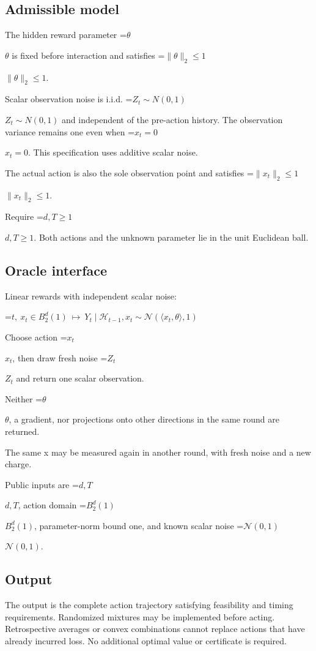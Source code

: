 \documentclass[10pt,a4paper]{article}
\newcommand{\AtlasMath}[1]{\par\begingroup\centering\setbox0=\hbox{$\displaystyle #1$}\ifdim\wd0>1.4\linewidth\typeout{ATLAS WIDE FORMULA: \the\wd0}\fi\ifdim\wd0>\linewidth\resizebox{\linewidth}{!}{\box0}\else\box0\fi\par\endgroup}
\newcommand{\AtlasInlineMath}[1]{\begingroup\setbox0=\hbox{$#1$}\ifdim\wd0>.4\linewidth\endgroup\AtlasMath{#1}\else\endgroup$#1$\fi}
\begin{document}
\subsection{Admissible model}
The hidden reward parameter \AtlasInlineMath{\theta} is fixed before interaction and satisfies \AtlasInlineMath{\|\theta\|_2\le1}.

Scalar observation noise is i.i.d. \AtlasInlineMath{Z_t\sim N(0,1)} and independent of the pre-action history. The observation variance remains one even when \AtlasInlineMath{x_t=0}. This specification uses additive scalar noise.

The actual action is also the sole observation point and satisfies \AtlasInlineMath{\|x_t\|_2\le1}.

Require \AtlasInlineMath{d,T\ge1}. Both actions and the unknown parameter lie in the unit Euclidean ball.

\subsection{Oracle interface}
Linear rewards with independent scalar noise:


\AtlasMath{t,\ x_t\in B_2^d(1)\ \longmapsto\ Y_t\mid\mathcal{H}_{t-1},x_t\sim\mathcal{N}(\langle x_t,\theta\rangle,1)}


Choose action \AtlasInlineMath{x_t}, then draw fresh noise \AtlasInlineMath{Z_t} and return one scalar observation.

Neither \AtlasInlineMath{\theta}, a gradient, nor projections onto other directions in the same round are returned.

The same x may be measured again in another round, with fresh noise and a new charge.

Public inputs are \AtlasInlineMath{d,T}, action domain \AtlasInlineMath{B_2^d(1)}, parameter-norm bound one, and known scalar noise \AtlasInlineMath{\mathcal N(0,1)}.

\subsection{Output}
The output is the complete action trajectory satisfying feasibility and timing requirements. Randomized mixtures may be implemented before acting. Retrospective averages or convex combinations cannot replace actions that have already incurred loss. No additional optimal value or certificate is required.
\end{document}
